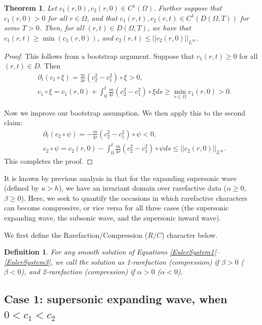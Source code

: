 \documentclass[11pt]{article}
\newtheorem{thm}{Theorem}[section]
\newtheorem{definition}{Definition}[section]
\begin{document}
\begin{thm}
	Let $c_1(r,0), c_2(r,0) \in C^1(\Omega)$. Further suppose that $c_1(r,0) > 0$ for all $r\in\Omega$, and that $c_1(r,t), c_2(r,t) \in C^1(D(\Omega,T))$ for some $T>0$. Then, for all $(r,t) \in D(\Omega,T)$, we have that $c_1(r,t)\geq \min(c_1(r,0))$, and $c_2(r,t) \leq ||c_2(r,0)||_{L^\infty}$.
\end{thm} 

\begin{proof}
This follows from a bootstrap argument. Suppose that $c_1(r,t) \geq 0$ for all $(r,t) \in D$. Then
\begin{align}
	&\partial_t(c_1\circ\xi) = \frac{m}{4r}(c_2^2-c_1^2)\circ\xi > 0,
	\\
	&c_1\circ\xi = c_1(r,0) + \int_0^t \frac{m}{4r}(c_2^2-c_1^2)\circ\xi ds \geq \min_{r \in \Omega}c_1(r,0) > 0. 
\end{align} 

Now we improve our bootstrap assumption. We then apply this to the second claim: 
\begin{align}
	&\partial_t(c_2\circ\psi) = -\frac{m}{4r}(c_2^2-c_1^2) \circ \psi < 0, 
	\\
	&c_2\circ\psi = c_2(r,0) - \int_0^t \frac{m}{4r}(c_2^2-c_1^2)\circ\psi ds \leq ||c_2(r,0)||_{L^\infty}. 
\end{align} 
This completes the proof. 
\end{proof} 

It is known by previous analysis in \cite{F1} that for the expanding supersonic wave (defined by $u>h$), we have an invariant domain over rarefactive data ($\alpha \geq  0$, $\beta \geq 0$). Here, we seek to quantify the occasions in which rarefactive characters can become compressive, or vice versa for all three cases (the supersonic expanding wave, the subsonic wave, and the supersonic inward wave).

We first define the Rarefaction/Compression ($R/C$) character below.

\begin{definition}
	For any smooth solution of Equations \eqref{EulerSystem1}--\eqref{EulerSystem3}, we 
	call the solution as 1-rarefaction (compression) if $\beta>0$ ($\beta<0$), and 2-rarefaction (compression) if $\alpha>0$ ($\alpha<0$).
\end{definition}


\subsection{Case 1: supersonic expanding wave, when $0<c_1<c_2$} 
\end{document}
